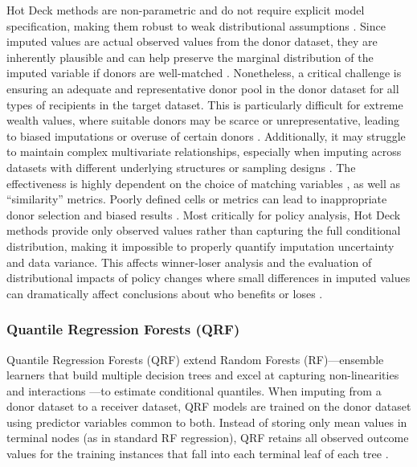 Hot Deck methods are non-parametric and do not require explicit model specification, making them robust to weak distributional assumptions \citep{dorazio2021statistical}. Since imputed values are actual observed values from the donor dataset, they are inherently plausible and can help preserve the marginal distribution of the imputed variable if donors are well-matched \citep{andridge2010review}. Nonetheless, a critical challenge is ensuring an adequate and representative donor pool in the donor dataset for all types of recipients in the target dataset. This is particularly difficult for extreme wealth values, where suitable donors may be scarce or unrepresentative, leading to biased imputations or overuse of certain donors \citep{haziza2009imputation}. Additionally, it may struggle to maintain complex multivariate relationships, especially when imputing across datasets with different underlying structures or sampling designs \citep{siddique2008multiple}. The effectiveness is highly dependent on the choice of matching variables \citep{ota2012revenue}, as well as “similarity” metrics. Poorly defined cells or metrics can lead to inappropriate donor selection and biased results \citep{andridge2010review}. Most critically for policy analysis, Hot Deck methods provide only observed values rather than capturing the full conditional distribution, making it impossible to properly quantify imputation uncertainty and data variance. This affects winner-loser analysis and the evaluation of distributional impacts of policy changes where small differences in imputed values can dramatically affect conclusions about who benefits or loses \citep{rubin1987multiple, reiter2005significance}.

\subsubsection{Quantile Regression Forests (QRF)}

Quantile Regression Forests (QRF) \citep{meinshausen2006quantile} extend Random Forests (RF)—ensemble learners that build multiple decision trees and excel at capturing non-linearities and interactions \citep{breiman2001random}—to estimate conditional quantiles. When imputing from a donor dataset to a receiver dataset, QRF models are trained on the donor dataset using predictor variables common to both. Instead of storing only mean values in terminal nodes (as in standard RF regression), QRF retains all observed outcome values for the training instances that fall into each terminal leaf of each tree \citep{meinshausen2006quantile}. 

